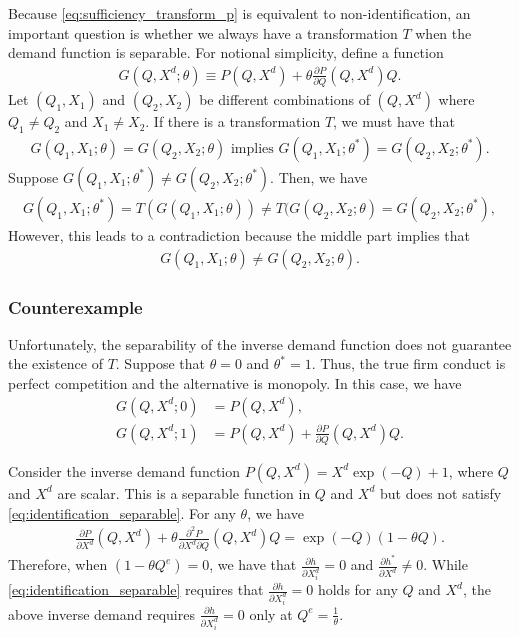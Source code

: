 \documentclass[11pt, a4paper]{article}
\theoremstyle{remark}
\begin{document}
Because \eqref{eq:sufficiency_transform_p} is equivalent to non-identification, an important question is whether we always have a transformation $T$  when the demand function is separable.
For notional simplicity, define a function
\begin{align}
    G(Q, X^{d}; \theta) \equiv P(Q, X^d) + \theta \frac{\partial P}{\partial Q}(Q, X^d) Q.
\end{align}
Let $(Q_1, X_1)$ and $(Q_2, X_2)$ be different combinations of $(Q,X^{d})$ where $Q_1 \ne Q_2$ and $X_1 \ne X_2$.
If there is a transformation $T$, we must have that
\begin{align}
    G(Q_1, X_1; \theta) = G(Q_2, X_2; \theta) \text{ implies } G(Q_1, X_1; \theta^{*}) = G(Q_2, X_2; \theta^{*}). \label{eq:existence_transformation}
\end{align}
Suppose $G(Q_1, X_1; \theta^{*}) \ne G(Q_2, X_2; \theta^{*})$.
Then, we have
\begin{align}
    G(Q_1, X_1; \theta^{*}) = T(G(Q_1, X_1; \theta)) \ne T(G(Q_2, X_2; \theta) = G(Q_2, X_2; \theta^{*}),
\end{align}
However, this leads to a contradiction because the middle part implies that
\begin{align}
     G(Q_1, X_1; \theta) \ne G(Q_2, X_2; \theta).
\end{align}

\subsubsection{Counterexample}
Unfortunately, the separability of the inverse demand function does not guarantee the existence of $T$.
Suppose that $\theta = 0$ and $\theta^{*} = 1$.
Thus, the true firm conduct is perfect competition and the alternative is monopoly.
In this case, we have
\begin{align}
    G(Q, X^{d};0) & = P(Q,X^{d}),\\
    G(Q, X^{d};1) & = P(Q, X^d) + \frac{\partial P}{\partial Q}(Q, X^d) Q.
\end{align}

Consider the inverse demand function $P(Q,X^{d}) = X^{d}\exp(-Q) + 1$, where $Q$ and $X^{d}$ are scalar.
This is a separable function in $Q$ and $X^d$ but does not satisfy \eqref{eq:identification_separable}.
For any $\theta$, we have
\begin{align}
    \frac{\partial P}{\partial X^{d}}(Q, X^{d}) + \theta \frac{\partial^2 P}{\partial X^{d}\partial Q}(Q, X^{d})Q  = \exp(-Q) (1 - \theta Q).
\end{align}
Therefore, when $(1 - \theta Q^e) = 0$, we have that $\frac{\partial h}{\partial X_{i}^d} = 0$ and $\frac{\partial h^{*}}{\partial X^d} \ne 0$.
While \eqref{eq:identification_separable} requires that $\frac{\partial h}{\partial X_{i}^d} =0$ holds for any $Q$ and $X^{d}$, the above inverse demand requires $\frac{\partial h}{\partial X_{i}^d}  = 0$ only at $Q^e = \frac{1}{\theta}$.
\end{document}
